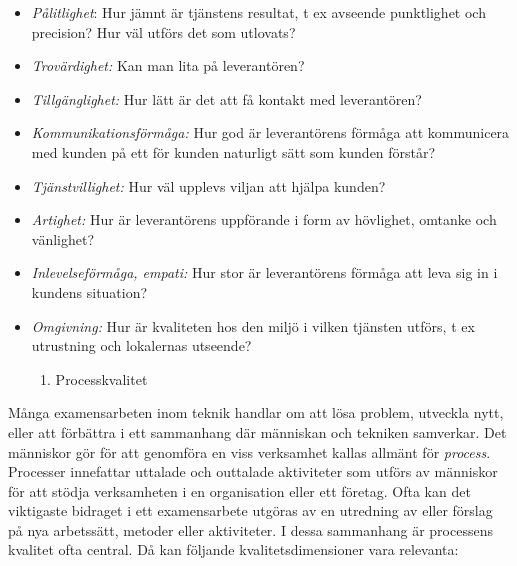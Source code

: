 \begin{itemize}
\item
  \emph{Pålitlighet}: Hur jämnt är tjänstens resultat, t ex avseende
  punktlighet och precision? Hur väl utförs det som utlovats?
\item
  \emph{Trovärdighet:} Kan man lita på leverantören?
\item
  \emph{Tillgänglighet:} Hur lätt är det att få kontakt med
  leverantören?
\item
  \emph{Kommunikationsförmåga:} Hur god är leverantörens förmåga att
  kommunicera med kunden på ett för kunden naturligt sätt som kunden
  förstår?
\item
  \emph{Tjänstvillighet:} Hur väl upplevs viljan att hjälpa kunden?
\item
  \emph{Artighet:} Hur är leverantörens uppförande i form av hövlighet,
  omtanke och vänlighet?
\item
  \emph{Inlevelseförmåga, empati:} Hur stor är leverantörens förmåga att
  leva sig in i kundens situation?
\item
  \emph{Omgivning:} Hur är kvaliteten hos den miljö i vilken tjänsten
  utförs, t ex utrustning och lokalernas utseende?

  \begin{enumerate}
  \def\labelenumi{\arabic{enumi}.}
  \item
    Processkvalitet
  \end{enumerate}
\end{itemize}

Många examensarbeten inom teknik handlar om att lösa problem, utveckla
nytt, eller att förbättra i ett sammanhang där människan och tekniken
samverkar. Det människor gör för att genomföra en viss verksamhet kallas
allmänt för \emph{process}. Processer innefattar uttalade och outtalade
aktiviteter som utförs av människor för att stödja verksamheten i en
organisation eller ett företag. Ofta kan det viktigaste bidraget i ett
examensarbete utgöras av en utredning av eller förslag på nya
arbetssätt, metoder eller aktiviteter. I dessa sammanhang är processens
kvalitet ofta central. Då kan följande kvalitetsdimensioner vara
relevanta:

